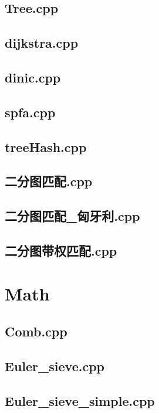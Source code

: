 \subsection{Tree.cpp}

\subsection{dijkstra.cpp}

\subsection{dinic.cpp}

\subsection{spfa.cpp}

\subsection{treeHash.cpp}

\subsection{二分图匹配.cpp}

\subsection{二分图匹配\_匈牙利.cpp}

\subsection{二分图带权匹配.cpp}

\section{Math}
\subsection{Comb.cpp}

\subsection{Euler\_sieve.cpp}

\subsection{Euler\_sieve\_simple.cpp}

